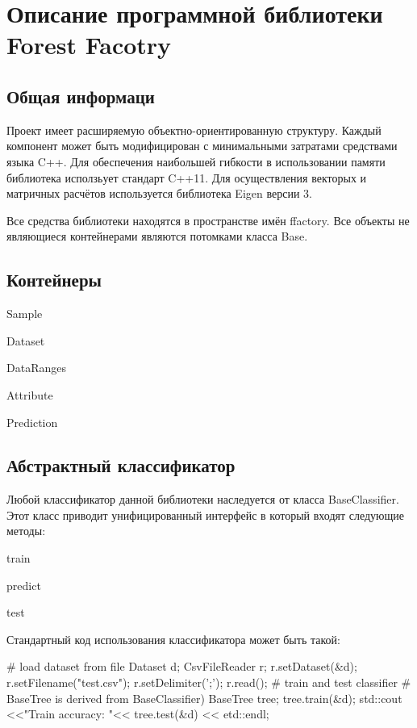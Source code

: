 \section*{Описание программной библиотеки Forest Facotry}

\subsection*{Общая информаци}

Проект имеет расширяемую объектно-\/ориентированную структуру. Каждый компонент может быть модифицирован с минимальными затратами средствами языка C++. Для обеспечения наибольшей гибкости в использовании памяти библиотека исползьует стандарт C++11. Для осуществления векторых и матричных расчётов используется библиотека Eigen версии 3.

Все средства библиотеки находятся в пространстве имён ffactory. Все объекты не являющиеся контейнерами являются потомками класса Base.

\subsection*{Контейнеры}


\begin{DoxyItemize}
\item Sample
\item Dataset
\item Data\-Ranges
\item Attribute
\item Prediction
\end{DoxyItemize}

\subsection*{Абстрактный классификатор}

Любой классификатор данной библиотеки наследуется от класса Base\-Classifier. Этот класс приводит унифицированный интерфейс в который входят следующие методы\-:


\begin{DoxyItemize}
\item train
\item predict
\item test
\end{DoxyItemize}

Стандартный код использования классификатора может быть такой\-: \begin{DoxyVerb}    # load dataset from file
        Dataset d;
        CsvFileReader r;
        r.setDataset(&d);
        r.setFilename("test.csv");
        r.setDelimiter(';');
        r.read();
    # train and test classifier
    # BaseTree is derived from BaseClassifier)
        BaseTree tree;
        tree.train(&d);
        std::cout <<"Train accuracy: "<< tree.test(&d) << etd::endl;
\end{DoxyVerb}


